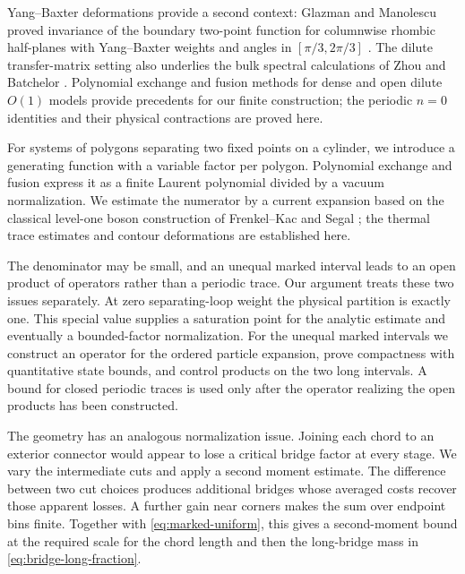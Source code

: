 Yang--Baxter deformations provide a second context: Glazman and Manolescu proved invariance of the boundary two-point function for columnwise rhombic half-planes with Yang--Baxter weights and angles in $[\pi/3,2\pi/3]$ \cite[Theorem~1]{GlazmanManolescu2017}. The dilute transfer-matrix setting also underlies the bulk spectral calculations of Zhou and Batchelor \cite{ZhouBatchelor1997}. Polynomial exchange and fusion methods for dense and open dilute $O(1)$ models \cite{DiFrancescoZinnJustin2005,GarbaliNienhuis2017Ground,GarbaliNienhuis2017Sum} provide precedents for our finite construction; the periodic $n=0$ identities and their physical contractions are proved here.

For systems of polygons separating two fixed points on a cylinder, we introduce a generating function with a variable factor per polygon. Polynomial exchange and fusion express it as a finite Laurent polynomial divided by a vacuum normalization. We estimate the numerator by a current expansion based on the classical level-one boson construction of Frenkel--Kac and Segal \cite{FrenkelKac1980,Segal1981,Frenkel1985}; the thermal trace estimates and contour deformations are established here.

The denominator may be small, and an unequal marked interval leads to an open product of operators rather than a periodic trace. Our argument treats these two issues separately. At zero separating-loop weight the physical partition is exactly one. This special value supplies a saturation point for the analytic estimate and eventually a bounded-factor normalization. For the unequal marked intervals we construct an operator for the ordered particle expansion, prove compactness with quantitative state bounds, and control products on the two long intervals. A bound for closed periodic traces is used only after the operator realizing the open products has been constructed.

The geometry has an analogous normalization issue. Joining each chord to an exterior connector would appear to lose a critical bridge factor at every stage. We vary the intermediate cuts and apply a second moment estimate. The difference between two cut choices produces additional bridges whose averaged costs recover those apparent losses. A further gain near corners makes the sum over endpoint bins finite. Together with \eqref{eq:marked-uniform}, this gives a second-moment bound at the required scale for the chord length and then the long-bridge mass in \eqref{eq:bridge-long-fraction}.

